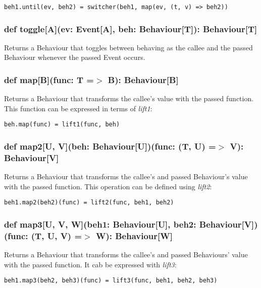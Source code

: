 \begin{verbatim}
beh1.until(ev, beh2) = switcher(beh1, map(ev, (t, v) => beh2))
\end{verbatim}      
      
    \subsubsection*{def toggle[A](ev: Event[A], beh: Behaviour[T]): Behaviour[T]}
      Returns a Behaviour that toggles between behaving as the callee
      and the passed Behaviour whenever the passed Event occurs.
      
    \subsubsection*{def map[B](func: T =$>$ B): Behaviour[B]}
      Returns a Behaviour that transforms the callee's
      value with the passed function.
      This function can be expressed in terms of \emph{lift1}:

\begin{verbatim}
beh.map(func) = lift1(func, beh)
\end{verbatim}      
      
    \subsubsection*{def map2[U, V](beh: Behaviour[U])(func: (T, U) =$>$ V): Behaviour[V]}
      Returns a Behaviour that transforms the callee's
      and passed Behaviour's value with the passed function. This operation
      can be defined using \emph{lift2}:

\begin{verbatim}
beh1.map2(beh2)(func) = lift2(func, beh1, beh2)
\end{verbatim}      

    \subsubsection*{def map3[U, V, W](beh1: Behaviour[U], beh2: Behaviour[V])(func: (T, U, V) =$>$ W): Behaviour[W]}
      Returns a Behaviour that transforms the callee's
      and passed Behaviours' value with the passed function. It cab
      be expressed with \emph{lift3}:

\begin{verbatim}
beh1.map3(beh2, beh3)(func) = lift3(func, beh1, beh2, beh3)
\end{verbatim}    

